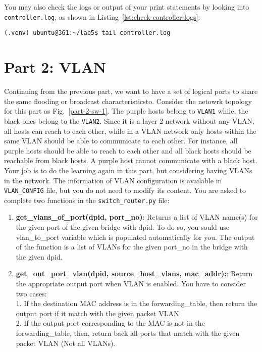 \documentclass[11pt]{article}
\begin{document}
You may also check the logs or output of your print statements by looking into \texttt{controller.log}, as shown in Listing~\ref{lst:check-controller-logs}. 


\begin{lstlisting}[style=ece361shell, caption={Create the network topology for first part}, label={lst:check-controller-logs}]
(.venv) ubuntu@361:~/lab5$ tail controller.log
\end{lstlisting}



\section{Part 2: VLAN}
\label{sec:exercise2}

Continuing from the previous part, we want to have a set of logical ports to share the same flooding or broadcast characteristicsto. Consider the netowrk topology for this part as Fig.~\ref{part-2-sw-1}. The purple hosts belong to \texttt{VLAN1} while, the black ones belong to the \texttt{VLAN2}. Since it is a layer 2 network without any VLAN, all hosts can reach to each other, while in a VLAN network only hosts within the same VLAN should be able to communicate to each other. For instance, all purple hosts should be able to reach to each other and all black hosts should be reachable from black hosts. A purple host cannot communicate with a black host. Your job is to do the learning again in this part, but considering having VLANs in the network. The information of VLAN configuration is available in \texttt{VLAN\_CONFIG} file, but you do not need to modify its content. You are asked to complete two functions in the \texttt{switch\_router.py} file:


\begin{enumerate}
    \item \textbf{get\_vlans\_of\_port(dpid, port\_no)}: Returns a list of VLAN name(s) for the given port of the given bridge with dpid. To do so, you sould use vlan\_to\_port variable which is populated automatically for you. The output of the function is a list of VLANs for the given port\_no in the bridge with the given dpid.

    \item \textbf{get\_out\_port\_vlan(dpid, source\_host\_vlans, mac\_addr):}: Return the appropriate output port when VLAN is enabled. You have to consider two cases:\\
        1. If the destination MAC address is in the forwarding\_table, then return the output port
           if it match with the given packet VLAN\\
        2. If the output port corresponding to the MAC is not in the forwarding\_table, then,
          return back all ports that match with the given packet VLAN (Not all VLANs).

\end{enumerate}
\end{document}
